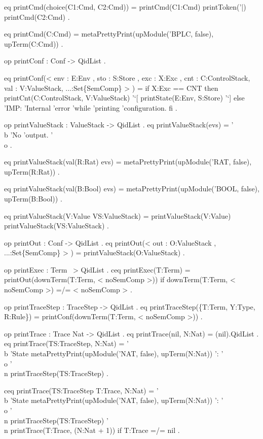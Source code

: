 \documentclass{llncs}%
\begin{document}
    eq printCmd(choice(C1:Cmd, C2:Cmd)) = printCmd(C1:Cmd)
       printToken('|) printCmd(C2:Cmd) .

    eq printCmd(C:Cmd) = metaPrettyPrint(upModule('BPLC, false), upTerm(C:Cmd)) .

    op printConf : Conf -> QidList .

    eq printConf(< env : E:Env , sto : S:Store , exc : X:Exc , cnt :
          C:ControlStack, val : V:ValueStack, ...:Set\{SemComp\} > ) =
      if X:Exc == CNT
          then printCnt(C:ControlStack, V:ValueStack) '`[ printState(E:Env, S:Store) '`]
          else 'IMP: 'Internal 'error 'while 'printing 'configuration.  fi .

    op printValueStack : ValueStack -> QidList .
    eq printValueStack(evs) = '\\b 'No 'output. '\\o .

    eq printValueStack(val(R:Rat) evs) =
       metaPrettyPrint(upModule('RAT, false), upTerm(R:Rat)) .

    eq printValueStack(val(B:Bool) evs) =
       metaPrettyPrint(upModule('BOOL, false), upTerm(B:Bool)) .

    eq printValueStack(V:Value VS:ValueStack) =
           printValueStack(V:Value) printValueStack(VS:ValueStack) .

    op printOut : Conf -> QidList .
    eq printOut(< out : O:ValueStack , ...:Set\{SemComp\} > ) =
       printValueStack(O:ValueStack) .

    op printExec : Term ~> QidList .
    ceq printExec(T:Term) = printOut(downTerm(T:Term, < noSemComp >))
    if downTerm(T:Term, < noSemComp >) =/= < noSemComp > .

    op printTraceStep : TraceStep -> QidList .
    eq printTraceStep(\{T:Term, Y:Type, R:Rule\}) =
       printConf(downTerm(T:Term, < noSemComp >)) .

    op printTrace : Trace Nat -> QidList .
    eq printTrace(nil, N:Nat) = (nil).QidList .
    eq printTrace(TS:TraceStep, N:Nat) =
           '\\b 'State metaPrettyPrint(upModule('NAT, false), upTerm(N:Nat)) ': '\\o '\\n
           printTraceStep(TS:TraceStep) .

    ceq printTrace(TS:TraceStep T:Trace, N:Nat) =
            '\\b 'State metaPrettyPrint(upModule('NAT, false), upTerm(N:Nat)) ': '\\o '\\n
            printTraceStep(TS:TraceStep) '\\n printTrace(T:Trace, (N:Nat + 1))
    if T:Trace =/= nil .
\end{document}
